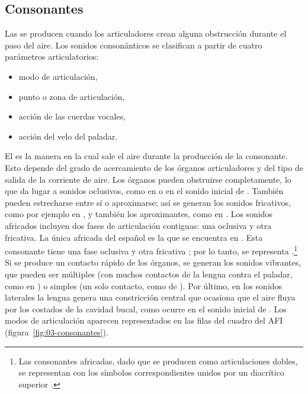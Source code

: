 \subsection{Consonantes}

Las  se producen cuando los articuladores crean alguna
obstrucción durante el paso del aire. Los sonidos consonánticos se clasifican a
partir de cuatro parámetros articulatorios:

\begin{itemize}
  \item modo de articulación,
  \item punto o zona de articulación,
  \item acción de las cuerdas vocales,
  \item acción del velo del paladar.
\end{itemize}

El  es la manera en la cual sale el aire durante
la producción de la consonante. Esto depende del grado de acercamiento de los
órganos articuladores y del tipo de salida de la corriente de aire. Los órganos
pueden obstruirse completamente, lo que da lugar a sonidos oclusivos, como
 en  o  en el sonido inicial de
. También pueden estrecharse entre sí o aproximarse; así se
generan los sonidos fricativos, como por ejemplo  en
, y también los aproximantes, como  en
. Los sonidos africados incluyen dos fases de articulación
contiguas: una oclusiva y otra fricativa. La única africada del español es la
que se encuentra en . Esta consonante tiene una fase
oclusiva  y otra fricativa ; por lo tanto, se representa
.\footnote{Las consonantes africadas, dado que se producen como
articulaciones dobles, se representan con los símbolos correspondientes unidos
por un diacrítico superior .} Si se produce un contacto rápido de los
órganos, se generan los sonidos vibrantes, que pueden ser múltiples (con muchos
contactos de la lengua contra el paladar, como  en )
o simples (un solo contacto, como  de ). Por último,
en los sonidos laterales la lengua genera una constricción central que ocasiona
que el aire fluya por los costados de la cavidad bucal, como ocurre en el sonido
inicial de  . Los modos de articulación aparecen
representados en las filas del cuadro del AFI
(figura~\ref{fig:03-consonantes}).


